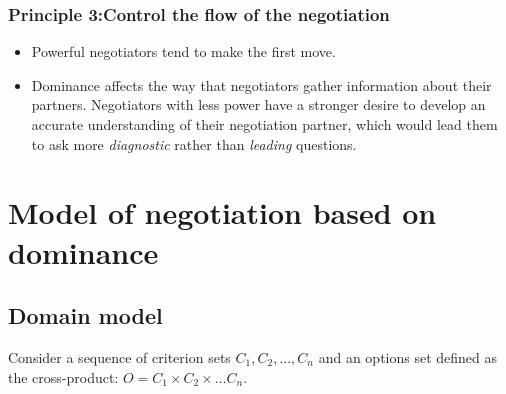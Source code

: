 \documentclass{llncs}
\begin{document}
					\subsubsection{Principle 3:Control the flow of the negotiation}
					\begin{itemize}
						\item Powerful negotiators tend to make the first move. \cite{magee2007power}
						
						
						\item Dominance affects the way that negotiators gather information about their partners. Negotiators with less power have a stronger desire to develop an accurate understanding of their negotiation partner, which would lead them to ask more \emph{diagnostic} rather than \emph{leading} questions.
						
					\end{itemize} 
					
						

	\section{Model of negotiation based on dominance}
				\subsection{Domain model}
				Consider a sequence of criterion sets $C_1, C_2, ..., C_n$ and an options set defined as the cross-product:
				$O = C_1 \times C_2 \times \ldots C_n$.
				
\end{document}

